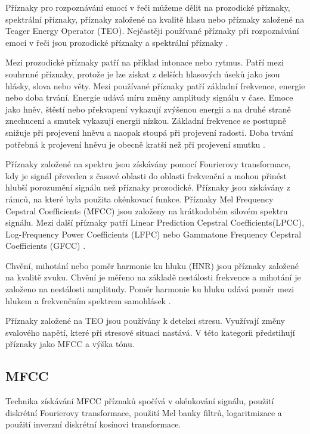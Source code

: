 \documentclass[FM,BP]{tulthesis}
\begin{document}
Příznaky pro rozpoznávání emocí v řeči můžeme dělit na prozodické příznaky, spektrální příznaky, příznaky založené na kvalitě hlasu nebo příznaky založené na Teager Energy Operator (TEO). Nejčastěji používané příznaky při rozpoznávání emocí v řeči jsou prozodické příznaky a spektrální příznaky \cite{DBLP:journals/speech/AkcayO20}.

Mezi prozodické příznaky patří na příklad intonace nebo rytmus. Patří mezi souhrnné příznaky, protože je lze získat z delších hlasových úseků jako jsou hlásky, slova nebo věty. Mezi používané příznaky patří základní frekvence, energie nebo doba trvání. Energie udává míru změny amplitudy signálu v čase. Emoce jako hněv, štěstí nebo překvapení vykazují zvýšenou energii a na druhé straně znechucení a smutek vykazují energii nízkou. Základní frekvence se postupně snižuje při projevení hněvu a naopak stoupá při projevení radosti. Doba trvání potřebná k projevení hněvu je obecně kratší než při projevení smutku \cite{DBLP:journals/speech/AkcayO20}.

Příznaky založené na spektru jsou získávány pomocí Fourierovy transformace, kdy je signál převeden z časové oblasti do oblasti frekvenční a mohou přinést hlubší porozumění signálu než příznaky prozodické. Příznaky jsou získávány z rámců, na které byla použita okénkovací funkce. Příznaky Mel Frequency Cepstral Coefficients (MFCC) jsou založeny na krátkodobém silovém spektru signálu. Mezi další příznaky patří Linear Prediction Cepstral Coefficients(LPCC), Log-Frequency Power Coefficients (LFPC) nebo Gammatone Frequency Cepstral Coefficients (GFCC) \cite{DBLP:journals/speech/AkcayO20}.

Chvění, mihotání nebo poměr harmonie ku hluku (HNR) jsou příznaky založené na kvalitě zvuku. Chvění je měřeno na základě nestálosti frekvence a mihotání je založeno na nestálosti amplitudy. Poměr harmonie ku hluku udává poměr mezi hlukem a frekvenčním spektrem samohlásek \cite{DBLP:journals/speech/AkcayO20}.

Příznaky založené na TEO jsou používány k detekci stresu. Využívají změny svalového napětí, které při stresové situaci nastává. V této kategorii předstihují příznaky jako MFCC a výška tónu.

\subsection{MFCC}
Technika získávání MFCC příznaků spočívá v okénkování signálu, použití diskrétní Fourierovy transformace, použití Mel banky filtrů, logaritmizace a použití inverzní diskrétní kosínovi transformace. 
\end{document}
